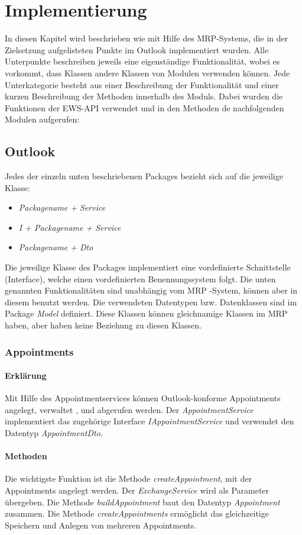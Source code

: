 \chapter{Implementierung}
In diesen Kapitel wird beschrieben wie mit Hilfe des MRP-Systems, die in der Zielsetzung aufgelisteten Punkte im Outlook implementiert wurden. Alle Unterpunkte beschreiben jeweils eine eigenständige Funktionalität, wobei es vorkommt, dass Klassen andere Klassen von Modulen verwenden können. Jede Unterkategorie besteht aus einer Beschreibung der Funktionalität und einer kurzen Beschreibung der Methoden innerhalb des Moduls. Dabei wurden die Funktionen der EWS-API verwendet und in den Methoden de nachfolgenden Modulen aufgerufen: 
\section{Outlook}
Jedes der einzeln unten beschriebenen Packages bezieht sich auf die jeweilige Klasse: 
\begin{itemize}
	\item \textit{Packagename + Service }
	\item \textit{I + Packagename + Service}
	\item \textit{Packagename + Dto}
\end{itemize}
Die jeweilige Klasse des Packages implementiert eine vordefinierte Schnittstelle (Interface), welche einen vordefinierten Benennungssystem folgt. Die unten genannten Funktionalitäten sind unabhängig vom MRP -System, können aber in diesem benutzt werden. Die verwendeten Datentypen bzw. Datenklassen sind im Package \textit{Model} definiert. Diese Klassen können gleichnamige Klassen im MRP haben, aber haben keine Beziehung zu diesen Klassen. 
\subsection{Appointments}
\subsubsection{Erklärung}
Mit Hilfe des Appointmentservices können Outlook-konforme Appointments angelegt, verwaltet , und abgerufen werden. Der \textit{AppointmentService} implementiert das zugehörige Interface \textit{IAppointmentService} und verwendet den Datentyp \textit{AppointmentDto}.
\subsubsection{Methoden}
Die wichtigste Funktion ist die Methode \textit{createAppointment}, mit der Appointments angelegt werden. Der \textit{ExchangeService} wird als Parameter übergeben. Die Methode \textit{buildAppointment} baut den Datentyp \textit{Appointment} zusammen. Die Methode \textit{createAppointments} ermöglicht das gleichzeitige Speichern und Anlegen von mehreren Appointments. \\

